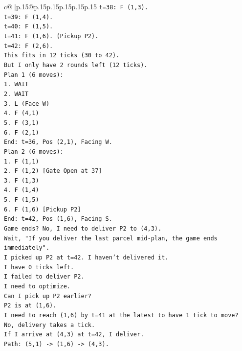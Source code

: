 \documentclass{article}
\begin{document}
{\begin{supertabular}{c@{$\;$}|p{.15\linewidth}@{}p{.15\linewidth}p{.15\linewidth}p{.15\linewidth}p{.15\linewidth}p{.15\linewidth}}
{{{\texttt{t=38: F (1,3).} \\
\texttt{t=39: F (1,4).} \\
\texttt{t=40: F (1,5).} \\
\texttt{t=41: F (1,6). (Pickup P2).} \\
\texttt{t=42: F (2,6).} \\
\texttt{This fits in 12 ticks (30 to 42).} \\
\texttt{But I only have 2 rounds left (12 ticks).} \\
\texttt{Plan 1 (6 moves):} \\
\texttt{1. WAIT} \\
\texttt{2. WAIT} \\
\texttt{3. L (Face W)} \\
\texttt{4. F (4,1)} \\
\texttt{5. F (3,1)} \\
\texttt{6. F (2,1)} \\
\texttt{End: t=36, Pos (2,1), Facing W.} \\
\texttt{Plan 2 (6 moves):} \\
\texttt{1. F (1,1)} \\
\texttt{2. F (1,2) {[}Gate Open at 37{]}} \\
\texttt{3. F (1,3)} \\
\texttt{4. F (1,4)} \\
\texttt{5. F (1,5)} \\
\texttt{6. F (1,6) {[}Pickup P2{]}} \\
\texttt{End: t=42, Pos (1,6), Facing S.} \\
\texttt{Game ends? No, I need to deliver P2 to (4,3).} \\
\texttt{Wait, "If you deliver the last parcel mid{-}plan, the game ends immediately".} \\
\texttt{I picked up P2 at t=42. I haven't delivered it.} \\
\texttt{I have 0 ticks left.} \\
\texttt{I failed to deliver P2.} \\
\texttt{I need to optimize.} \\
\texttt{Can I pick up P2 earlier?} \\
\texttt{P2 is at (1,6).} \\
\texttt{I need to reach (1,6) by t=41 at the latest to have 1 tick to move? No, delivery takes a tick.} \\
\texttt{If I arrive at (4,3) at t=42, I deliver.} \\
\texttt{Path: (5,1) {-}> (1,6) {-}> (4,3).} \\
}}}
\end{supertabular}}
\end{document}
